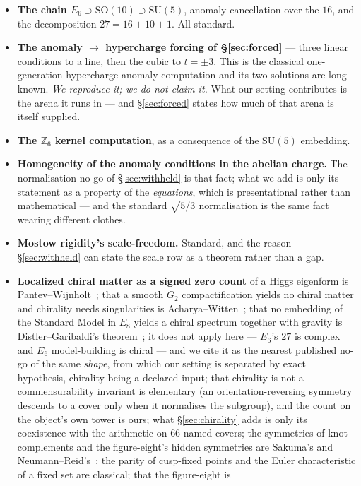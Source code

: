 \documentclass[11pt,a4paper]{article}
\theoremstyle{definition}
\theoremstyle{remark}
\newcommand{\Z}{\mathbb{Z}}
\begin{document}
\begin{itemize}[leftmargin=1.4em,itemsep=2pt]
\item \textbf{The chain $E_6 \supset \mathrm{SO}(10) \supset \mathrm{SU}(5)$}, anomaly cancellation
over the $16$, and the decomposition $27 = 16 + 10 + 1$. All standard.
\item \textbf{The anomaly $\to$ hypercharge forcing of \S\ref{sec:forced}} --- three linear
conditions to a line, then the cubic to $t = \pm3$. This is the classical one-generation
hypercharge-anomaly computation and its two solutions are long known. \emph{We reproduce it; we do
not claim it.} What our setting contributes is the arena it runs in --- and \S\ref{sec:forced} states
how much of that arena is itself supplied.
\item \textbf{The $\Z_6$ kernel computation}, as a consequence of the $\mathrm{SU}(5)$ embedding.
\item \textbf{Homogeneity of the anomaly conditions in the abelian charge.} The normalisation no-go
of \S\ref{sec:withheld} is that fact; what we add is only its statement as a property of the
\emph{equations}, which is presentational rather than mathematical --- and the standard
$\sqrt{5/3}$ normalisation is the same fact wearing different clothes.
\item \textbf{Mostow rigidity's scale-freedom.} Standard, and the reason \S\ref{sec:withheld} can
state the scale row as a theorem rather than a gap.
\item \textbf{Localized chiral matter as a signed zero count} of a Higgs eigenform is Pantev--Wijnholt~\cite{pw}; that a
smooth $G_2$ compactification yields no chiral matter and chirality needs singularities is Acharya--Witten~\cite{aw}; that no
embedding of the Standard Model in $E_8$ yields a chiral spectrum together with gravity is Distler--Garibaldi's
theorem~\cite{dg}; it does not apply here --- $E_6$'s $27$ is complex and $E_6$ model-building is chiral --- and we cite it as
the nearest published no-go of the same \emph{shape}, from which our setting is separated by exact hypothesis, chirality
being a declared input; that chirality is not a commensurability invariant is elementary (an orientation-reversing symmetry descends to a cover only when it normalises the subgroup), and the count on the object's own tower is ours; what \S\ref{sec:chirality} adds is only its coexistence with the
arithmetic on $66$ named covers; the symmetries of knot complements and
the figure-eight's hidden symmetries are Sakuma's and Neumann--Reid's~\cite{sakuma,nr};
the parity of cusp-fixed points and the Euler characteristic of a fixed set are classical; that the figure-eight is

\end{itemize}
\end{document}
